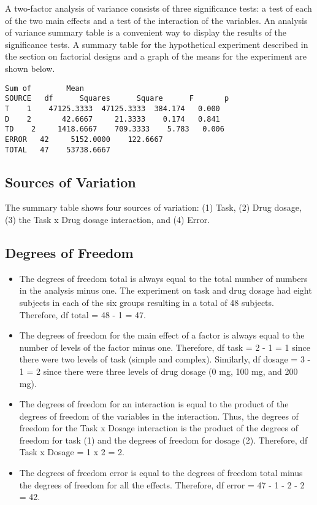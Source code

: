 A two-factor analysis of variance consists of three significance tests: a test of each of the two main effects and a test of the interaction of the variables. An analysis of variance summary table is a convenient way to display the results of the significance tests. A summary table for the hypothetical experiment described in the section on factorial designs and a graph of the means for the experiment are shown below.

\begin{verbatim}
Sum of        Mean
SOURCE   df      Squares      Square      F       p
T    1    47125.3333  47125.3333  384.174   0.000
D    2       42.6667     21.3333    0.174   0.841
TD    2     1418.6667    709.3333    5.783   0.006
ERROR   42     5152.0000    122.6667
TOTAL   47    53738.6667
\end{verbatim}

\subsection{Sources of Variation}

The summary table shows four sources of variation: (1) Task, (2) Drug dosage, (3) the Task x Drug dosage interaction, and (4) Error.

\subsection{Degrees of Freedom}

\begin{itemize}
	\item The degrees of freedom total is always equal to the total number of numbers in the analysis minus one. The experiment on task and drug dosage had eight subjects in each of the six groups resulting in a total of 48 subjects. Therefore, df total = 48 - 1 = 47.
	
	\item The degrees of freedom for the main effect of a factor is always equal to the number of levels of the factor minus one. Therefore, df task = 2 - 1 = 1 since there were two levels of task (simple and complex). Similarly, df dosage = 3 - 1 = 2 since there were three levels of drug dosage (0 mg, 100 mg, and 200 mg).
	
	\item The degrees of freedom for an interaction is equal to the product of the degrees of freedom of the variables in the interaction. Thus, the degrees of freedom for the Task x Dosage interaction is the product of the degrees of freedom for task (1) and the degrees of freedom for dosage (2). Therefore, df Task x Dosage = 1 x 2 = 2.
	
	\item The degrees of freedom error is equal to the degrees of freedom total minus the degrees of freedom for all the effects. Therefore, df error = 47 - 1 - 2 - 2 = 42.
\end{itemize}

